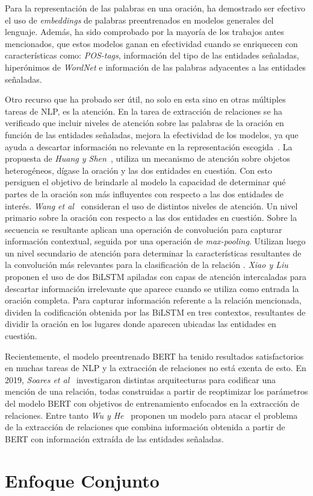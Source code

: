 Para la representación de las palabras en una oración, ha demostrado ser efectivo el uso de \textit{embeddings} de palabras preentrenados en modelos generales del lenguaje.
Además, ha sido comprobado por la mayoría de los trabajos antes mencionados, que estos modelos ganan en efectividad cuando se enriquecen con características como: \textit{POS-tags}, información del tipo de las entidades señaladas, hiperónimos de \textit{WordNet} e información de las palabras adyacentes a las entidades señaladas.

Otro recurso que ha probado ser útil, no solo en esta sino en otras múltiples tareas de NLP, es la atención. 
En la tarea de extracción de relaciones se ha verificado que incluir niveles de atención sobre las palabras de la oración en función de las entidades señaladas, mejora la efectividad de los modelos, ya que ayuda a descartar información no relevante en la representación escogida~\cite{huang2016attention, wang2016relation, xiao2016semantic, lee2019semantic}.
La propuesta de \textit{Huang y Shen}~\cite{huang2016attention}, utiliza un mecanismo de atención sobre objetos heterogéneos, dígase la oración y las dos entidades en cuestión.
Con esto persiguen el objetivo de brindarle al modelo la capacidad de determinar qué partes de la oración son más influyentes con respecto a las dos entidades de interés.
\textit{Wang et al}~\cite{wang2016relation} consideran el uso de distintos niveles de atención.
Un nivel primario sobre la oración con respecto a las dos entidades en cuestión.
Sobre la secuencia se resultante aplican una operación de convolución para capturar información contextual, seguida por una operación de \textit{max-pooling}.
Utilizan luego un nivel secundario de atención para determinar la características resultantes de la convolución más relevantes para la clasificación de la relación .
\textit{Xiao y Liu}~\cite{xiao2016semantic} proponen el uso de dos BiLSTM apiladas con capas de atención intercaladas para descartar información irrelevante que aparece cuando se utiliza como entrada la oración completa.
Para capturar información referente a la relación mencionada, dividen la codificación obtenida por las BiLSTM en tres contextos, resultantes de dividir la oración en los lugares donde aparecen ubicadas las entidades en cuestión.

Recientemente, el modelo preentrenado BERT ha tenido resultados satisfactorios en muchas tareas de NLP y la extracción de relaciones no está exenta de esto.
En 2019, \textit{Soares et al}~\cite{soares2019matching} investigaron distintas arquitecturas para codificar una mención de una relación, todas construidas a partir de reoptimizar los parámetros del modelo BERT con objetivos de entrenamiento enfocados en la extracción de relaciones. 
Entre tanto \textit{Wu y He}~\cite{wu2019enriching} proponen un modelo para atacar el problema de la extracción de relaciones que combina información obtenida a partir de BERT con información extraída de las entidades señaladas.

\section{Enfoque Conjunto}

